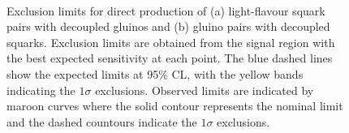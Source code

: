 \begin{figure}[tbp]
\begin{center}
\\
\end{center}
\caption{Exclusion limits for direct production of (a) light-flavour squark pairs with decoupled gluinos and (b) gluino pairs with decoupled squarks.
Exclusion limits are obtained from the signal region with the best expected sensitivity at each point.
The blue dashed lines show the expected limits at 95\% CL, with the yellow bands indicating the $1\sigma$ exclusions.
Observed limits are indicated by maroon curves where the solid contour represents the nominal limit and the dashed countours indicate the $1\sigma$ exclusions.
}
\label{fig:sensitivitytext}
\end{figure}

